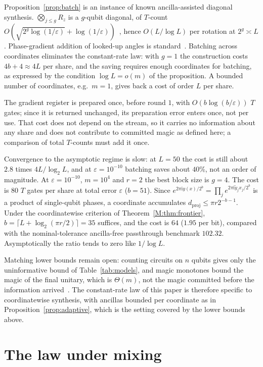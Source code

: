 \documentclass[aps,prx,twocolumn,superscriptaddress,nofootinbib,longbibliography]{revtex4-2}
\theoremstyle{plain}
\theoremstyle{definition}
\theoremstyle{remark}
\newcommand{\dproj}{d_{\mathrm{proj}}}
\begin{document}
Proposition~\ref{prop:batch} is an instance of known ancilla-assisted diagonal synthesis. $\bigotimes_{j\le g}R_z$ is a $g$-qubit diagonal, of $T$-count $O(\sqrt{2^g\log(1/\varepsilon)}+\log(1/\varepsilon))$~\cite{LKS,GKW}, hence $O(L/\log L)$ per rotation at $2^g\asymp L$. Phase-gradient addition of looked-up angles is standard~\cite{Gidney,Sanders}. Batching across coordinates eliminates the constant-rate law: with $g=1$ the construction costs $4b+4\approx4L$ per share, and the saving requires enough coordinates for batching, as expressed by the condition $\log L=o(m)$ of the proposition. A bounded number of coordinates, e.g.\ $m=1$, gives back a cost of order $L$ per share. 

The gradient register is prepared once, before round $1$, with $O(b\log(b/\varepsilon))$ $T$ gates; since it is returned unchanged, its preparation error enters once, not per use. That cost does not depend on the stream, so it carries no information about any share and does not contribute to committed magic as defined here; a comparison of total $T$-counts must add it once. 

Convergence to the asymptotic regime is slow: at $L=50$ the cost is still about $2.8$ times $4L/\log_2L$, and at $\varepsilon=10^{-10}$ batching saves about $40\%$, not an order of magnitude.
At $\varepsilon=10^{-10}$, $m=10^4$ and $r=2$ the best block size is $g=4$. The cost is $80$ $T$ gates per share at total error $\varepsilon$ ($b=51$). Since $e^{2\pi\mathrm iy(x)/2^b}=\prod_je^{2\pi\mathrm i\tilde y_jx_j/2^b}$ is a product of single-qubit phases, a coordinate accumulates $\dproj\le\pi r2^{-b-1}$. Under the coordinatewise criterion of Theorem~\ref{M:thm:frontier}, $b=\lceil L+\log_2(\pi r/2)\rceil=35$ suffices, and the cost is $64$ ($1.95$ per bit), compared with the nominal-tolerance ancilla-free passthrough benchmark $102.32$. Asymptotically the ratio tends to zero like $1/\log L$. 

Matching lower bounds remain open: counting circuits on $n$ qubits gives only the uninformative bound of Table~\ref{tab:models}, and magic monotones bound the magic of the final unitary, which is $\Theta(m)$, not the magic committed before the information arrived~\cite{BCHK,GKW}. The constant-rate law of this paper is therefore specific to coordinatewise synthesis, with ancillas bounded per coordinate as in Proposition~\ref{prop:adaptive}, which is the setting covered by the lower bounds above.

\section{The law under mixing}\label{sec:mixing}
\end{document}

